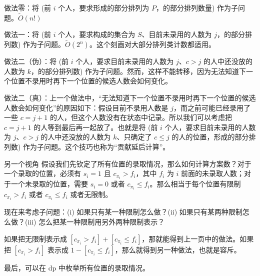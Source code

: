 \begin{frame}
    做法零：将 (前 $i$ 个人，要求形成的部分排列为 $P$，的部分排列数量) 作为子问题。$\tilde O(n!)$

    做法一：将 (前 $i$ 个人，要求构成的集合为 $S$、目前未录用的人数为 $j$，的部分排列数) 作为子问题。$\tilde O(2^n)$。这个刻画对大部分排列类计数都适用。

    做法二（伪）：将 (前 $i$ 个人，要求目前未录用的人数为 $j$、$c>j$ 的人中还没放的人数为 $k$，的部分排列数) 作为子问题。然而，这样不能转移，因为无法知道下一个位置不录用时再下一个位置的候选人数会如何变化。

    做法二（真）：上一个做法中，“无法知道下一个位置不录用时再下一个位置的候选人数会如何变化”的原因如下：假设目前不录用人数是 $j$，而之前可能已经录用了一些 $c=j+1$ 的人，但这个人数没有在状态中记录。所以我们可以考虑把 $c=j+1$ 的人等到最后再一起放了。也就是将 (前 $i$ 个人，要求目前未录用的人数为 $j$、$c>j$ 的人中还没放的人数为 $k$、只确定了 $c\le j$ 的人的位置，形成的部分排列数) 作为子问题。这个技巧也称为“贡献延后计算”。
\end{frame}
\begin{frame}{另一个视角}
    假设我们先钦定了所有位置的录取情况，那么如何计算方案数？对于一个录取的位置，必须有 $s_i=1$ 且 $c_{\pi_i}>f_i$，其中 $f_i$ 为 $i$ 前面的未录取人数；对于一个未录取的位置，需要 $s_i=0$ 或者 $c_{\pi_i}\le f_i$。那么相当于每个位置有限制 $c_{\pi_i}>f_i$ 或者 $c_{\pi_i}\le f_i$ 或者无限制。

    现在来考虑子问题：(i) 如果只有某一种限制怎么做？(ii) 如果只有某两种限制怎么做？(iii) 怎么把某一种限制用另外两种限制表示？

    如果把无限制表示成 $[c_{\pi_i}>f_i]+[c_{\pi_i}\le f_i]$，那就能得到上一页中的做法。如果把 $[c_{\pi_i}>f_i]$ 表示成 $1-[c_{\pi_i}\le f_i]$，那么就得到另一种做法，也就是容斥。

    最后，可以在 dp 中枚举所有位置的录取情况。    
\end{frame}

